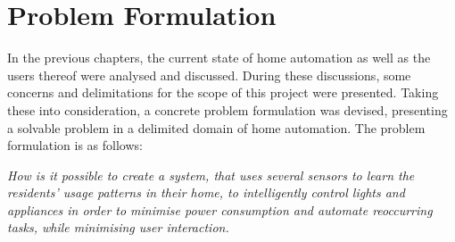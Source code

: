 \section{Problem Formulation}\label{problemFormulation}
In the previous chapters, the current state of home automation as well as the users thereof were analysed and discussed. During these discussions, some concerns and delimitations for the scope of this project were presented. Taking these into consideration, a concrete problem formulation was devised, presenting a solvable problem in a delimited domain of home automation. The problem formulation is as follows:

\emph{How is it possible to create a system, that uses several sensors to learn the residents’ usage patterns in their home, to intelligently control lights and appliances in order to minimise power consumption and automate reoccurring tasks, while minimising user interaction.}
